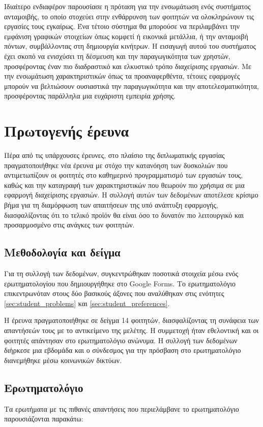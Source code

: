             Ιδιαίτερο ενδιαφέρον παρουσίασε η πρόταση για την ενσωμάτωση ενός συστήματος ανταμοιβής, το οποίο στοχεύει στην ενθάρρυνση των φοιτητών να ολοκληρώνουν τις εργασίες τους εγκαίρως. Ένα τέτοιο σύστημα θα μπορούσε να περιλαμβάνει την εμφάνιση γραφικών στοιχείων όπως κομφετί ή εικονικά μετάλλια, ή την ανταμοιβή πόντων, συμβάλλοντας στη δημιουργία κινήτρων. Η εισαγωγή αυτού του συστήματος έχει σκοπό να ενισχύσει τη δέσμευση και την παραγωγικότητα των χρηστών, προσφέροντας έναν πιο διαδραστικό και ελκυστικό τρόπο διαχείρισης εργασιών. Με την ενσωμάτωση χαρακτηριστικών όπως τα προαναφερθέντα, τέτοιες εφαρμογές μπορούν να βελτιώσουν ουσιαστικά την παραγωγικότητα και την αποτελεσματικότητα, προσφέροντας παράλληλα μια ευχάριστη εμπειρία χρήσης.

    \section{Πρωτογενής έρευνα}
        Πέρα από τις υπάρχουσες έρευνες, στο πλαίσιο της διπλωματικής εργασίας πραγματοποιήθηκε νέα έρευνα με στόχο την κατανόηση των δυσκολιών που αντιμετωπίζουν οι φοιτητές στο καθημερινό προγραμματισμό των εργασιών τους, καθώς και την καταγραφή των χαρακτηριστικών που θεωρούν πιο χρήσιμα σε μια εφαρμογή διαχείρισης εργασιών. Η συλλογή αυτών των δεδομένων αποτέλεσε κρίσιμο βήμα για τη διαμόρφωση των απαιτήσεων της υπό ανάπτυξη εφαρμογής, διασφαλίζοντας ότι το τελικό προϊόν θα είναι όσο το δυνατόν πιο λειτουργικό και προσαρμοσμένο στις ανάγκες των φοιτητών.

        \subsection{Μεθοδολογία και δείγμα}
            Για τη συλλογή των δεδομένων, συγκεντρώθηκαν ποσοτικά στοιχεία μέσω ενός ερωτηματολογίου που δημιουργήθηκε στο Google Forms. Το ερωτηματολόγιο επικεντρωνόταν στους δύο βασικούς άξονες που αναλύθηκαν στις ενότητες \ref{sec:student_problems} και \ref{sec:student_preferences}.

            Η έρευνα πραγματοποιήθηκε σε δείγμα 14 φοιτητών, διασφαλίζοντας τη συνάφεια των απαντήσεών τους με το αντικείμενο της μελέτης. Η συμμετοχή ήταν εθελοντική και οι φοιτητές απάντησαν στο ερωτηματολόγιο ανώνυμα. Η συλλογή των δεδομένων διήρκεσε μια εβδομάδα και ο σύνδεσμος για την πρόσβαση στο ερωτηματολόγιο διανεμήθηκε μέσω κοινωνικών δικτύων.

        \subsection{Ερωτηματολόγιο} \label{sec:pollstats}
            Τα ερωτήματα με τις πιθανές απαντήσεις που περιελάμβανε το ερωτηματολόγιο παρουσιάζονται παρακάτω:

